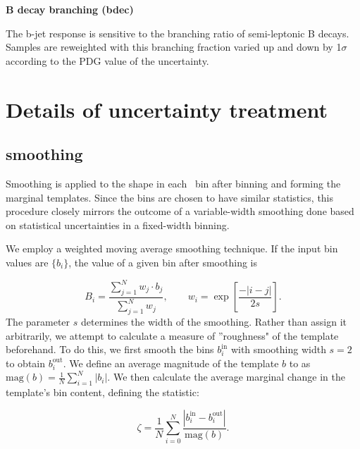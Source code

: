 \par \noindent
\textbf{B decay branching (bdec)} 

The b-jet response is sensitive to the branching ratio of semi-leptonic B decays. Samples are reweighted with this branching fraction varied up and down by 1$\sigma$ according to the PDG value of the uncertainty. 






\section{Details of uncertainty treatment}

\label{S:uncdetails}
\subsection{smoothing}
\label{SS:processing}


Smoothing is applied to the \Mbl shape in each \DYbl\, bin after binning and forming the marginal templates. Since the bins are chosen to have similar statistics, this procedure closely mirrors the outcome of a variable-width smoothing done based on statistical uncertainties in a fixed-width binning. 

We employ a weighted moving average smoothing technique. If the input bin values are $\{b_i\}$, the value of a given bin after smoothing is 

\begin{equation}
    B_i = \frac{ \sum_{j=1}^N w_j\cdot b_j}{\sum_{j=1}^N w_j},\quad\quad
    w_i = \exp{\left[\frac{-|i-j|}{2s}\right]}.
    \label{eq:smooth}
\end{equation}
The parameter $s$ determines the width of the smoothing. Rather than assign it arbitrarily, we attempt to calculate a measure of ''roughness" of the template beforehand. To do this, we first smooth the bins $b^\mathrm{in}_i$ with smoothing width $s=2$ to obtain $b^\mathrm{out}_i$. We  define an average magnitude of the template $b$ to as $\mathrm{mag}(b) = \frac{1}{N}\sum_{i=1}^N |b_i|$. We then calculate the average marginal change in the template's bin content, defining the statistic:

\begin{equation}
\zeta = \frac{1}{N}\sum_{i=0}^N  \frac{|b^\mathrm{in}_i-b^\mathrm{out}_i|}{\mathrm{mag}(b)}.
\end{equation}

